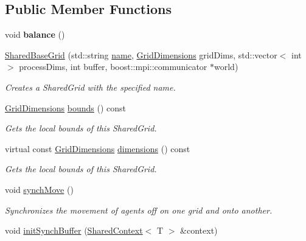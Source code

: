 \subsection*{Public Member Functions}
\begin{DoxyCompactItemize}
\item 
\hypertarget{classrepast_1_1_shared_base_grid_a6e2cf26b8580f27b9f4bda6afb125987}{void {\bfseries balance} ()}\label{classrepast_1_1_shared_base_grid_a6e2cf26b8580f27b9f4bda6afb125987}

\item 
\hyperlink{classrepast_1_1_shared_base_grid_aa9c93cbd1c9d92839fe8d0a24dbf4279}{Shared\-Base\-Grid} (std\-::string \hyperlink{classrepast_1_1_projection_ab60a0ab4f584685780307d7431b61800}{name}, \hyperlink{classrepast_1_1_grid_dimensions}{Grid\-Dimensions} grid\-Dims, std\-::vector$<$ int $>$ process\-Dims, int buffer, boost\-::mpi\-::communicator $\ast$world)
\begin{DoxyCompactList}\small\item\em Creates a Shared\-Grid with the specified name. \end{DoxyCompactList}\item 
\hyperlink{classrepast_1_1_grid_dimensions}{Grid\-Dimensions} \hyperlink{classrepast_1_1_shared_base_grid_a9eb45d3b57a22564ce892de6bd96e84e}{bounds} () const 
\begin{DoxyCompactList}\small\item\em Gets the local bounds of this Shared\-Grid. \end{DoxyCompactList}\item 
virtual const \hyperlink{classrepast_1_1_grid_dimensions}{Grid\-Dimensions} \hyperlink{classrepast_1_1_shared_base_grid_a9ec19652232000368ec1fe98ff47e121}{dimensions} () const 
\begin{DoxyCompactList}\small\item\em Gets the local bounds of this Shared\-Grid. \end{DoxyCompactList}\item 
void \hyperlink{classrepast_1_1_shared_base_grid_a99014d8854b57524c9cd40e9cea0507a}{synch\-Move} ()
\begin{DoxyCompactList}\small\item\em Synchronizes the movement of agents off on one grid and onto another. \end{DoxyCompactList}\item 
void \hyperlink{classrepast_1_1_shared_base_grid_a5703bee6037934b6be70d4f17a6b4d7b}{init\-Synch\-Buffer} (\hyperlink{classrepast_1_1_shared_context}{Shared\-Context}$<$ T $>$ \&context)

\end{DoxyCompactItemize}
